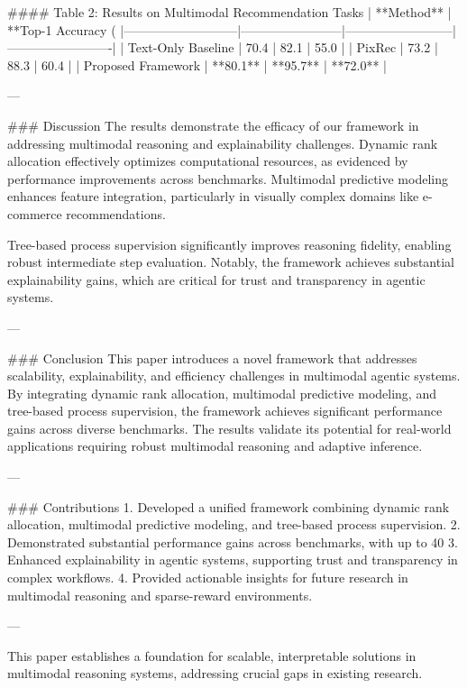 #### Table 2: Results on Multimodal Recommendation Tasks  
| **Method**                | **Top-1 Accuracy (%
|---------------------------|------------------------|--------------------------|-------------------------|
| Text-Only Baseline        | 70.4                  | 82.1                    | 55.0                   |
| PixRec                    | 73.2                  | 88.3                    | 60.4                   |
| Proposed Framework        | **80.1**              | **95.7**                | **72.0**               |

---

### Discussion  
The results demonstrate the efficacy of our framework in addressing multimodal reasoning and explainability challenges. Dynamic rank allocation effectively optimizes computational resources, as evidenced by performance improvements across benchmarks. Multimodal predictive modeling enhances feature integration, particularly in visually complex domains like e-commerce recommendations.

Tree-based process supervision significantly improves reasoning fidelity, enabling robust intermediate step evaluation. Notably, the framework achieves substantial explainability gains, which are critical for trust and transparency in agentic systems.

---

### Conclusion  
This paper introduces a novel framework that addresses scalability, explainability, and efficiency challenges in multimodal agentic systems. By integrating dynamic rank allocation, multimodal predictive modeling, and tree-based process supervision, the framework achieves significant performance gains across diverse benchmarks. The results validate its potential for real-world applications requiring robust multimodal reasoning and adaptive inference.

---

### Contributions  
1. Developed a unified framework combining dynamic rank allocation, multimodal predictive modeling, and tree-based process supervision.  
2. Demonstrated substantial performance gains across benchmarks, with up to 40%
3. Enhanced explainability in agentic systems, supporting trust and transparency in complex workflows.  
4. Provided actionable insights for future research in multimodal reasoning and sparse-reward environments.

--- 

This paper establishes a foundation for scalable, interpretable solutions in multimodal reasoning systems, addressing crucial gaps in existing research.